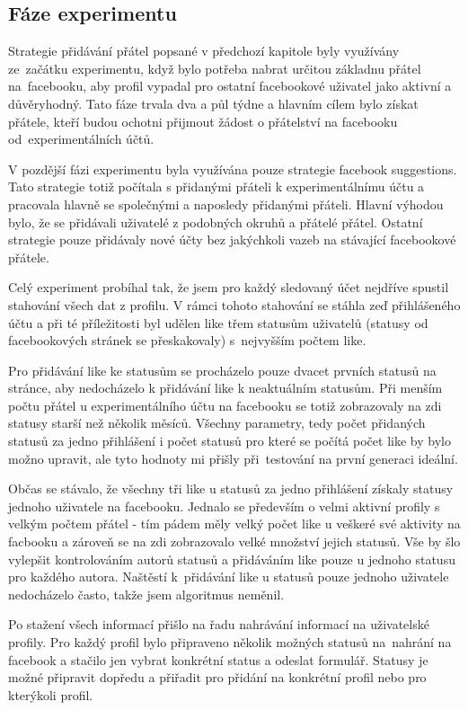 \documentclass[thesis=M,czech]{FITthesis}[2013/05/10]
\begin{document}
\subsection{Fáze experimentu}

Strategie přidávání přátel popsané v předchozí kapitole byly využívány ze~začátku experimentu, když bylo potřeba nabrat určitou základnu přátel na~facebooku, aby profil vypadal pro ostatní facebookové uživatel jako aktivní a důvěryhodný. Tato fáze trvala dva a půl týdne a hlavním cílem bylo získat přátele, kteří budou ochotni přijmout žádost o přátelství na facebooku od~experimentálních účtů. 

V pozdější fázi experimentu byla využívána pouze strategie facebook suggestions. Tato strategie totiž počítala s přidanými přáteli k experimentálnímu účtu a pracovala hlavně se společnými a naposledy přidanými přáteli. Hlavní výhodou bylo, že se přidávali uživatelé z podobných okruhů a přátelé přátel. Ostatní strategie pouze přidávaly nové účty bez jakýchkoli vazeb na stávající facebookové přátele. 

Celý experiment probíhal tak, že jsem pro každý sledovaný účet nejdříve spustil stahování všech dat z profilu. V rámci tohoto stahování se stáhla zeď přihlášeného účtu a při té příležitosti byl udělen like třem statusům uživatelů (statusy od facebookových stránek se přeskakovaly) s~nejvyšším počtem like.

Pro přidávání like ke statusům se procházelo pouze dvacet prvních statusů na stránce, aby nedocházelo k přidávání like k neaktuálním statusům. Při menším počtu přátel u experimentálního účtu na facebooku se totiž zobrazovaly na zdi statusy starší než několik měsíců. Všechny parametry, tedy počet přidaných statusů za jedno přihlášení i počet statusů pro které se počítá počet like by bylo možno upravit, ale tyto hodnoty mi přišly při~testování na první generaci ideální.

Občas se stávalo, že všechny tři like u statusů za jedno přihlášení získaly statusy jednoho uživatele na facebooku. Jednalo se především o velmi aktivní profily s velkým počtem přátel - tím pádem měly velký počet like u veškeré své aktivity na facbooku a zároveň se na zdi zobrazovalo velké množství jejich statusů. Vše by šlo vylepšit kontrolováním autorů statusů a přidáváním like pouze u jednoho statusu pro každého autora. Naštěstí k~přidávání like u statusů pouze jednoho uživatele nedocházelo často, takže jsem algoritmus neměnil.

Po stažení všech informací přišlo na řadu nahrávání informací na uživatelské profily. Pro každý profil bylo připraveno několik možných statusů na~nahrání na facebook a stačilo jen vybrat konkrétní status a odeslat formulář. Statusy je možné připravit dopředu a přiřadit pro přidání na konkrétní profil nebo pro kterýkoli profil.
\end{document}
